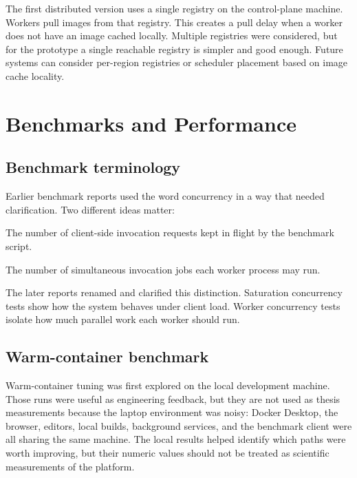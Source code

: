 \documentclass[12pt,a4paper]{report}
\begin{document}
The first distributed version uses a single registry on the control-plane
machine. Workers pull images from that registry. This creates a pull delay when
a worker does not have an image cached locally. Multiple registries were
considered, but for the prototype a single reachable registry is simpler and
good enough. Future systems can consider per-region registries or scheduler
placement based on image cache locality.

\clearpage

\chapter{Benchmarks and Performance}

\section{Benchmark terminology}

Earlier benchmark reports used the word concurrency in a way that needed
clarification. Two different ideas matter:

\begin{description}[leftmargin=4.2cm,style=nextline]
  \item[Saturation concurrency] The number of client-side invocation requests kept in flight by the benchmark script.
  \item[Worker invocation concurrency] The number of simultaneous invocation jobs each worker process may run.
\end{description}

The later reports renamed and clarified this distinction. Saturation
concurrency tests show how the system behaves under client load. Worker
concurrency tests isolate how much parallel work each worker should run.

\section{Warm-container benchmark}

Warm-container tuning was first explored on the local development machine.
Those runs were useful as engineering feedback, but they are not used as thesis
measurements because the laptop environment was noisy: Docker Desktop, the
browser, editors, local builds, background services, and the benchmark client
were all sharing the same machine. The local results helped identify which
paths were worth improving, but their numeric values should not be treated as
scientific measurements of the platform.
\end{document}
